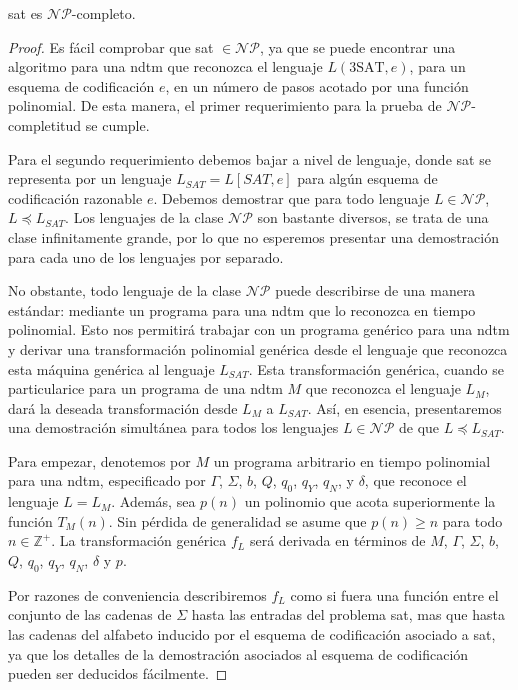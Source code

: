 \documentclass[11pt, a4paper]{memoir}
\begin{document}
\begin{thm}
  \gls{sat} es $\mathcal{NP}$-completo.
\end{thm}

\begin{proof}
Es fácil comprobar que \gls{sat}	$\in \mathcal{NP}$, ya que se puede encontrar una algoritmo para una \gls{ndtm} que reconozca el lenguaje $L(\mbox{3SAT},e)$, para un esquema de codificación $e$, en un número de pasos acotado por una función polinomial. De esta manera, el primer requerimiento para la prueba de $\mathcal{NP}$-completitud se cumple.

Para el segundo requerimiento debemos bajar a nivel de lenguaje, donde \gls{sat} se representa por un lenguaje $L_{SAT}=L[SAT,e]$ para algún esquema de codificación razonable $e$. Debemos demostrar que para todo lenguaje $L\in \mathcal{NP}$, $L \preceq L_{SAT}$. Los lenguajes de la clase $\mathcal{NP}$ son bastante diversos, se trata de una clase infinitamente grande, por lo que no esperemos presentar una demostración para cada uno de los lenguajes por separado.

No obstante, todo lenguaje de la clase $\mathcal{NP}$ puede describirse de una manera estándar: mediante un programa para una \gls{ndtm} que lo reconozca en tiempo polinomial. Esto nos permitirá trabajar con un programa genérico para una \gls{ndtm} y derivar una transformación polinomial genérica desde el lenguaje que reconozca esta máquina genérica al lenguaje $L_{SAT}$. Esta transformación genérica, cuando se particularice para un programa de una \gls{ndtm} $M$ que reconozca el lenguaje $L_M$, dará la deseada transformación desde $L_M$ a $L_{SAT}$. Así, en esencia, presentaremos una demostración simultánea para todos los lenguajes $L\in \mathcal{NP}$ de que $L \preceq L_{SAT}$.

Para empezar, denotemos por $M$ un programa arbitrario en tiempo polinomial para una \gls{ndtm}, especificado por $\Gamma$, $\Sigma$, $b$, $Q$, $q_0$, $q_Y$, $q_N$, y $\delta$, que reconoce el lenguaje $L=L_M$. Además, sea $p(n)$ un polinomio que acota superiormente la función $T_M(n)$. Sin pérdida de generalidad se asume que $p(n)\ge n$ para todo $n\in \mathbb{Z}^+$. La transformación genérica $f_L$ será derivada en términos de $M$, $\Gamma$, $\Sigma$, $b$, $Q$, $q_0$, $q_Y$, $q_N$, $\delta$ y $p$.

Por razones de conveniencia describiremos $f_L$ como si fuera una función entre el conjunto de las cadenas de $\Sigma$ hasta las entradas del problema \gls{sat}, mas que hasta las cadenas del alfabeto inducido por el esquema de codificación asociado a \gls{sat}, ya que los detalles de la demostración asociados al esquema de codificación pueden ser deducidos fácilmente.


\end{proof}
\end{document}

